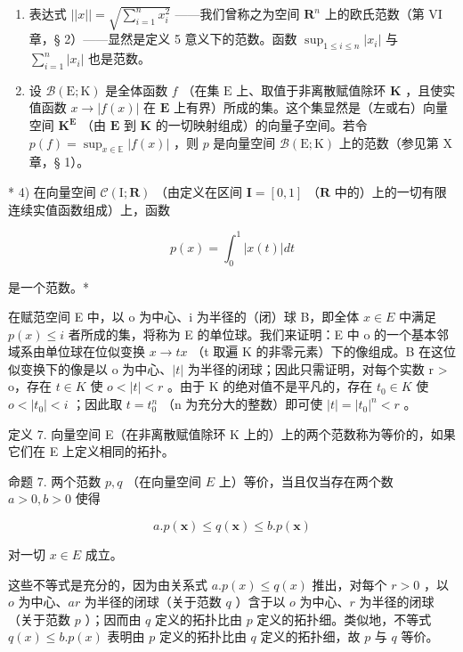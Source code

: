 \begin{enumerate}
\def\labelenumi{\arabic{enumi})}
\setcounter{enumi}{1}
\item
  表达式 \(||x|| = \sqrt{\sum_{i=1}^{n} x_i^2}\) ——我们曾称之为空间 \(\mathbf{R}^n\) 上的欧氏范数（第 VI 章，§ 2）——显然是定义 5 意义下的范数。函数 \(\sup_{1 \leqslant i \leqslant n} |x_i|\) 与 \(\sum_{i=1}^{n} |x_i|\) 也是范数。
\item
  设 \(\mathcal{B}(\mathrm{E};\mathrm{K})\) 是全体函数 \(f\) （在集 \(\mathrm{E}\) 上、取值于非离散赋值除环 \(\mathbf{K}\) ，且使实值函数 \(x\to |f(x)|\) 在 \(\mathbf{E}\) 上有界）所成的集。这个集显然是（左或右）向量空间 \(\mathbf{K}^{\mathbf{E}}\) （由 \(\mathbf{E}\) 到 \(\mathbf{K}\) 的一切映射组成）的向量子空间。若令 \(p(f)=\sup_{x\in\mathbb{E}}|f(x)|\) ，则 \(p\) 是向量空间 \(\mathcal{B}(\mathrm{E};\mathrm{K})\) 上的范数（参见第 X 章，§ 1）。
\end{enumerate}

* 4) 在向量空间 \(\mathcal{C}(\mathrm{I};\mathbf{R})\) （由定义在区间 \(\mathbf{I} = [0,1]\) （\(\mathbf{R}\) 中的）上的一切有限连续实值函数组成）上，函数

\[
p (x) = \int_ {0} ^ {1} | x (t) | d t
\]

是一个范数。*

在赋范空间 E 中，以 o 为中心、i 为半径的（闭）球 B，即全体 \(x \in E\) 中满足 \(p(x) \leqslant i\) 者所成的集，将称为 E 的单位球。我们来证明：E 中 o 的一个基本邻域系由单位球在位似变换 \(x \to tx\) （t 取遍 K 的非零元素）下的像组成。B 在这位似变换下的像是以 o 为中心、\(|t|\) 为半径的闭球；因此只需证明，对每个实数 r \textgreater{} o，存在 \(t \in K\) 使 \(o < |t| < r\) 。由于 K 的绝对值不是平凡的，存在 \(t_{0} \in K\) 使 \(o < |t_{0}| < i\) ；因此取 \(t = t_{0}^{n}\) （n 为充分大的整数）即可使 \(|t| = |t_{0}|^{n} < r\) 。

定义 7. 向量空间 E（在非离散赋值除环 K 上的）上的两个范数称为等价的，如果它们在 E 上定义相同的拓扑。

命题 7. 两个范数 \(p, q\) （在向量空间 \(E\) 上）等价，当且仅当存在两个数 \(a > 0, b > 0\) 使得

\[
a. p (\pmb {x}) \leqslant q (\pmb {x}) \leqslant b. p (\pmb {x})\tag{I}
\]

对一切 \(x \in E\) 成立。

这些不等式是充分的，因为由关系式 \(a.p(x) \leqslant q(x)\) 推出，对每个 \(r > 0\) ，以 \(o\) 为中心、\(ar\) 为半径的闭球（关于范数 \(q\) ）含于以 \(o\) 为中心、\(r\) 为半径的闭球（关于范数 \(p\) ）；因而由 \(q\) 定义的拓扑比由 \(p\) 定义的拓扑细。类似地，不等式 \(q(x) \leqslant b.p(x)\) 表明由 \(p\) 定义的拓扑比由 \(q\) 定义的拓扑细，故 \(p\) 与 \(q\) 等价。

